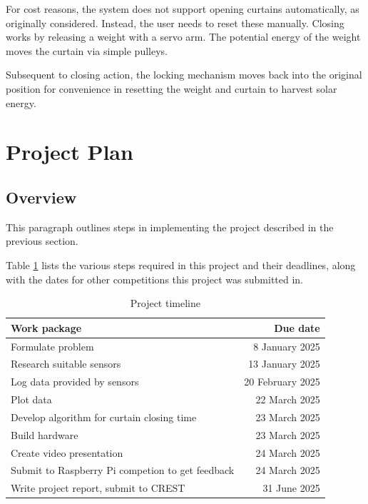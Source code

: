 \documentclass[a4paper,12pt]{article}
\begin{document}
For cost reasons, the system does not support opening curtains automatically, as originally considered. Instead, the user needs to reset these manually.
Closing works by releasing a weight with a servo arm. The potential energy of the weight moves the curtain via simple pulleys.

Subsequent to closing action, the locking mechanism moves back into the original position for convenience in resetting the weight and curtain 
to harvest solar energy.

\section{Project Plan}

\subsection{Overview}

This paragraph outlines steps in implementing the project described in the previous section.

Table \ref{tab:projtimeline} lists the various steps required in this project and their deadlines, along with the dates for other competitions this project was submitted in.

\begin{table}[h!]
    \caption{Project timeline}
    \begin{tabular}{l | r}
        Work package & Due date \\
        \hline
        Formulate problem &  8 January 2025 \\
        Research suitable sensors & 13 January 2025 \\
        Log data provided by sensors & 20 February 2025 \\
        Plot data & 22 March 2025 \\
        Develop algorithm for curtain closing time & 23 March 2025 \\
        Build hardware & 23 March 2025 \\
        Create video presentation & 24 March 2025 \\
        Submit to Raspberry Pi competion to get feedback & 24 March 2025 \\
        Write project report, submit to CREST &  31 June 2025\\
    \end{tabular}
    \label{tab:projtimeline}
\end{table}
\end{document}
